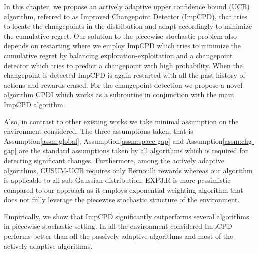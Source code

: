 In this chapter, we propose an actively adaptive upper confidence bound (UCB) algorithm, referred to as Improved Changepoint Detector (ImpCPD), that tries to locate the chnagepoints in the distribution and adapt accordingly to minimize the cumulative regret. Our solution to the piecewise stochastic problem also depends on restarting where we employ ImpCPD which tries to minimize the cumulative regret by balancing exploration-exploitation and a changepoint detector which tries to predict a changepoint with high probability. When the changepoint is detected ImpCPD is again restarted with all the past history of actions and rewards erased. For the changepoint detection we propose a novel algorithm CPDI which works as a subroutine in conjunction with the main ImpCPD algorithm.



	Also, in contrast to other existing works we take minimal assumption on the environment considered. The three assumptions taken, that is Assumption\ref{assm:global}, Assumption\ref{assm:space-gap} and Assumption\ref{assm:chg-gap} are the standard assumptions taken by all algorithms which is required for detecting significant changes. Furthermore, among the actively adaptive algorithms, CUSUM-UCB requires only Bernoulli rewards whereas our algorithm is applicable to all sub-Gaussian distribution, EXP3.R is more pessimistic compared to our approach as it employs exponential weighting algorithm that does not fully leverage the piecewise stochastic structure of the environment. 
	
	Empirically, we show that ImpCPD significantly outperforms several algorithms in piecewise stochastic setting. In all the environment considered ImpCPD performs better than all the passively adaptive algorithms and most of the actively adaptive algorithms. 
	

